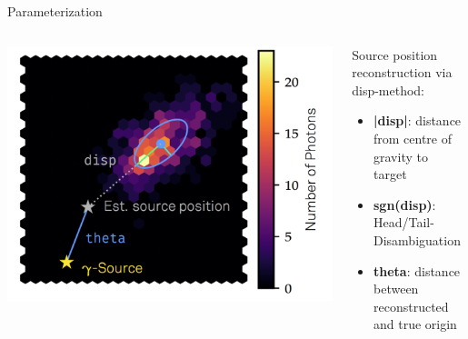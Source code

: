 \begin{frame}[t]{Parameterization}
    \begin{columns}[onlytextwidth]
        \begin{column}{0.475\textwidth}
            \includegraphics[width=\textwidth]{fig/disp.png}
        \end{column}
        \begin{column}{0.475\textwidth}
            Source position reconstruction via disp-method:
            \begin{itemize}
                \item \textbf{{\color{tugreen} |disp|}}: distance from centre of gravity to target
                \item \textbf{{\color{tugreen} sgn(disp)}}: Head/Tail-Disambiguation
                \item \textbf{{\color{tugreen} theta}}: distance between reconstructed and true origin
            \end{itemize}
        \end{column}
    \end{columns}
\end{frame}


